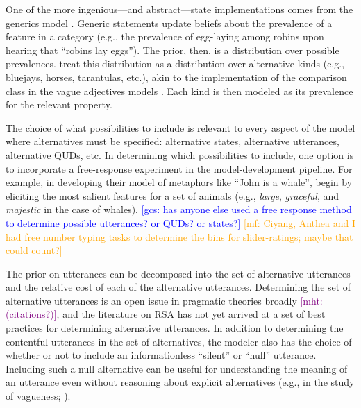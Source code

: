 \documentclass{sp}
\newcommand{\gcs}[1]{\textcolor{blue}{[gcs: #1]}}
\newcommand{\mf}[1]{\textcolor{orange}{[mf: #1]}}
\newcommand{\mht}[1]{\textcolor{purple}{[mht: #1]}}
\begin{document}
One of the more ingenious---and abstract---state implementations comes from the generics model \citep{tesslergoodman2019}. Generic statements update beliefs about the prevalence of a feature in a category (e.g., the prevalence of egg-laying among robins upon hearing that ``robins lay eggs''). The prior, then, is a distribution over possible prevalences. \citeauthor{tesslergoodman2019} treat this distribution as a distribution over alternative kinds (e.g., bluejays, horses, tarantulas, etc.), akin to the implementation of the comparison class in the vague adjectives models \citep{lassitergoodman2013, tessler2017comparisonclass}. Each kind is then modeled as its prevalence for the relevant property.

The choice of what possibilities to include is relevant to every aspect of the model where alternatives must be specified: alternative states, alternative utterances, alternative QUDs, etc. In determining which possibilities to include, one option is to incorporate a free-response experiment in the model-development pipeline. For example, in developing their model of metaphors like ``John is a whale'', \cite{kaoetal2014metaphor} begin by eliciting the most salient features for a set of animals (e.g., \emph{large}, \emph{graceful}, and \emph{majestic} in the case of whales).
\gcs{has anyone else used a free response method to determine possible utterances? or QUDs? or states?} \mf{Ciyang, Anthea and I had free number typing tasks to determine the bins for slider-ratings; maybe that could count?}


The prior on utterances can be decomposed into the set of alternative utterances and the relative cost of each of the alternative utterances.
Determining the set of alternative utterances is an open issue in pragmatic theories broadly \mht{(citations?)}, and the literature on RSA has not yet arrived at a set of best practices for determining alternative utterances. 
In addition to determining the contentful utterances in the set of alternatives, the modeler also has the choice of whether or not to include an informationless ``silent'' or ``null'' utterance. 
Including such a null alternative can be useful for understanding the meaning of an utterance even without reasoning about explicit alternatives (e.g., in the study of vagueness; \citealp{lassitergoodman2013}).
\end{document}
